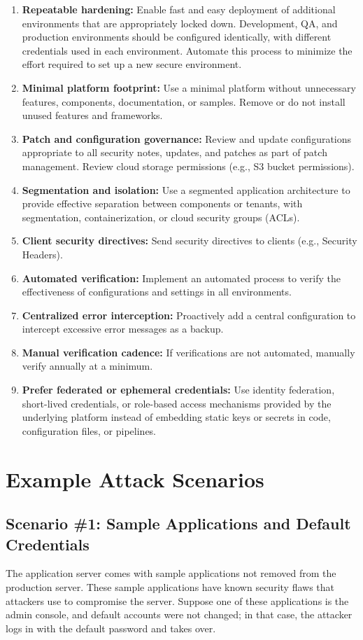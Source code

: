 \documentclass[11pt]{article}
\begin{document}
\begin{enumerate}
  \item \textbf{Repeatable hardening:} Enable fast and easy deployment of additional environments that are appropriately locked down. Development, QA, and production environments should be configured identically, with different credentials used in each environment. Automate this process to minimize the effort required to set up a new secure environment.
  \item \textbf{Minimal platform footprint:} Use a minimal platform without unnecessary features, components, documentation, or samples. Remove or do not install unused features and frameworks.
  \item \textbf{Patch and configuration governance:} Review and update configurations appropriate to all security notes, updates, and patches as part of patch management. Review cloud storage permissions (e.g., S3 bucket permissions).
  \item \textbf{Segmentation and isolation:} Use a segmented application architecture to provide effective separation between components or tenants, with segmentation, containerization, or cloud security groups (ACLs).
  \item \textbf{Client security directives:} Send security directives to clients (e.g., Security Headers).
  \item \textbf{Automated verification:} Implement an automated process to verify the effectiveness of configurations and settings in all environments.
  \item \textbf{Centralized error interception:} Proactively add a central configuration to intercept excessive error messages as a backup.
  \item \textbf{Manual verification cadence:} If verifications are not automated, manually verify annually at a minimum.
  \item \textbf{Prefer federated or ephemeral credentials:} Use identity federation, short-lived credentials, or role-based access mechanisms provided by the underlying platform instead of embedding static keys or secrets in code, configuration files, or pipelines.
\end{enumerate}

\section{Example Attack Scenarios}
\subsection{Scenario \#1: Sample Applications and Default Credentials}
The application server comes with sample applications not removed from the production server. These sample applications have known security flaws that attackers use to compromise the server. Suppose one of these applications is the admin console, and default accounts were not changed; in that case, the attacker logs in with the default password and takes over.
\end{document}
